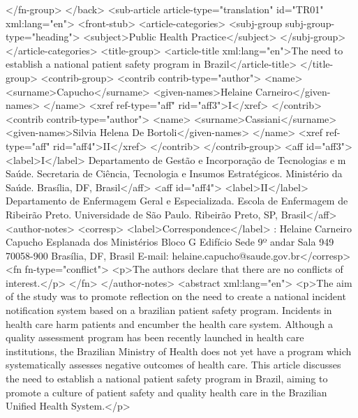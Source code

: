     </fn-group>
  </back>
  <sub-article article-type="translation" id="TR01" xml:lang="en">
    <front-stub>
      <article-categories>
        <subj-group subj-group-type="heading">
          <subject>Public Health Practice</subject>
        </subj-group>
      </article-categories>
      <title-group>
        <article-title xml:lang="en">The need to establish a national patient safety program in
          Brazil</article-title>
      </title-group>
      <contrib-group>
        <contrib contrib-type="author">
          <name>
            <surname>Capucho</surname>
            <given-names>Helaine Carneiro</given-names>
          </name>
          <xref ref-type="aff" rid="aff3">I</xref>
        </contrib>
        <contrib contrib-type="author">
          <name>
            <surname>Cassiani</surname>
            <given-names>Silvia Helena De Bortoli</given-names>
          </name>
          <xref ref-type="aff" rid="aff4">II</xref>
        </contrib>
      </contrib-group>
      <aff id="aff3">
        <label>I</label> Departamento de Gestão e Incorporação de Tecnologias e m Saúde. Secretaria
        de Ciência, Tecnologia e Insumos Estratégicos. Ministério da Saúde. Brasília, DF,
        Brasil</aff>
      <aff id="aff4">
        <label>II</label> Departamento de Enfermagem Geral e Especializada. Escola de Enfermagem de
        Ribeirão Preto. Universidade de São Paulo. Ribeirão Preto, SP, Brasil</aff>
      <author-notes>
        <corresp>
          <label>Correspondence</label> : Helaine Carneiro Capucho Esplanada dos Ministérios Bloco G
          Edifício Sede 9º andar Sala 949 70058-900 Brasília, DF, Brasil E-mail:
          helaine.capucho@saude.gov.br</corresp>
        <fn fn-type="conflict">
          <p>The authors declare that there are no conflicts of interest.</p>
        </fn>
      </author-notes>
      <abstract xml:lang="en">
        <p>The aim of the study was to promote reflection on the need to create a national incident
          notification system based on a brazilian patient safety program. Incidents in health care
          harm patients and encumber the health care system. Although a quality assessment program
          has been recently launched in health care institutions, the Brazilian Ministry of Health
          does not yet have a program which systematically assesses negative outcomes of health
          care. This article discusses the need to establish a national patient safety program in
          Brazil, aiming to promote a culture of patient safety and quality health care in the
          Brazilian Unified Health System.</p>
